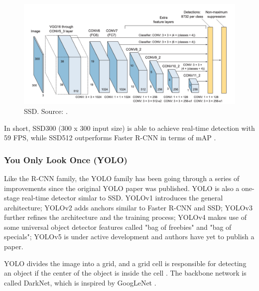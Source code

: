 \documentclass[a4paper, 11pt, oneside]{article}
\begin{document}
  \begin{figure}[ht]
    \begin{center}
      \includegraphics[width=.8\textwidth]{ssd.png}
    \end{center}
    \caption{SSD. Source: \cite{elgendy2020deep}.}
  \end{figure}

  In short, SSD300 (300 x 300 input size) is able to achieve real-time detection with 59 FPS, while SSD512 outperforms
  Faster R-CNN in terms of mAP \cite{liu2016ssd}.

  \subsubsection{You Only Look Once (YOLO)}

  Like the R-CNN family, the YOLO family has been going through a series of improvements since the original YOLO paper
  was published. YOLO is also a one-stage real-time detector simlar to SSD. YOLOv1 \cite{redmon2016you} introduces the
  general architecture; YOLOv2 \cite{redmon2017yolo9000} adds anchors similar to Faster R-CNN and SSD; YOLOv3
  \cite{redmon2018yolov3} further refines the architecture and the training process; YOLOv4 \cite{bochkovskiy2020yolov4}
  makes use of some universal object detector features called "bag of freebies" and "bag of specials"; YOLOv5 \cite{yolov5}
  is under active development and authors have yet to publish a paper.

  YOLO divides the image into a grid, and a grid cell is responsible for detecting an object if the center of the object
  is inside the cell \cite{elgendy2020deep, redmon2016you}. The backbone network is called DarkNet, which is inspired by
  GoogLeNet \cite{elgendy2020deep, redmon2016you}.
\end{document}
